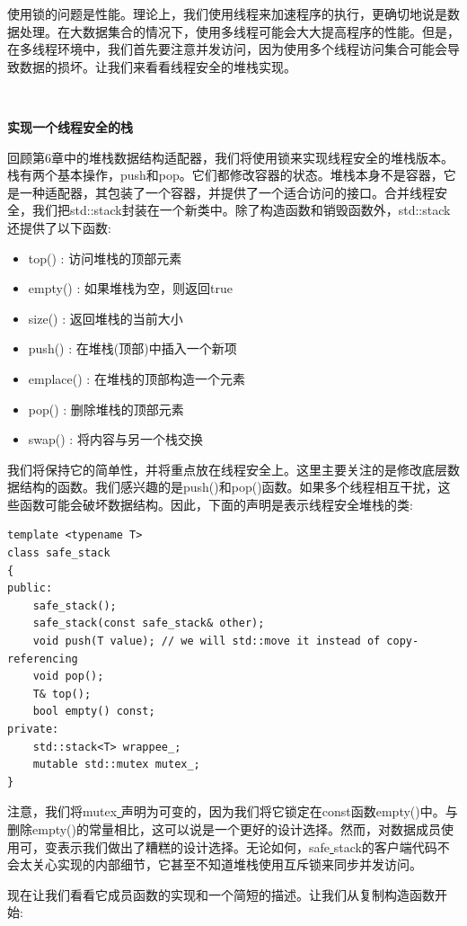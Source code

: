 使用锁的问题是性能。理论上，我们使用线程来加速程序的执行，更确切地说是数据处理。在大数据集合的情况下，使用多线程可能会大大提高程序的性能。但是，在多线程环境中，我们首先要注意并发访问，因为使用多个线程访问集合可能会导致数据的损坏。让我们来看看线程安全的堆栈实现。 \par

\noindent\textbf{}\ \par
\textbf{实现一个线程安全的栈} \ \par
回顾第6章中的堆栈数据结构适配器，我们将使用锁来实现线程安全的堆栈版本。栈有两个基本操作，push和pop。它们都修改容器的状态。堆栈本身不是容器，它是一种适配器，其包装了一个容器，并提供了一个适合访问的接口。合并线程安全，我们把std::stack封装在一个新类中。除了构造函数和销毁函数外，std::stack还提供了以下函数: \par

\begin{itemize}
	\item top() : 访问堆栈的顶部元素
	\item empty() : 如果堆栈为空，则返回true
	\item size() : 返回堆栈的当前大小
	\item push() : 在堆栈(顶部)中插入一个新项
	\item emplace() : 在堆栈的顶部构造一个元素
	\item pop() : 删除堆栈的顶部元素
	\item swap() : 将内容与另一个栈交换
\end{itemize}

我们将保持它的简单性，并将重点放在线程安全上。这里主要关注的是修改底层数据结构的函数。我们感兴趣的是push()和pop()函数。如果多个线程相互干扰，这些函数可能会破坏数据结构。因此，下面的声明是表示线程安全堆栈的类: \par

\begin{lstlisting}[caption={}]
template <typename T>
class safe_stack
{
public:
	safe_stack();
	safe_stack(const safe_stack& other);
	void push(T value); // we will std::move it instead of copy-referencing
	void pop();
	T& top();
	bool empty() const;
private:
	std::stack<T> wrappee_;
	mutable std::mutex mutex_;
}
\end{lstlisting}

注意，我们将mutex\underline{ }声明为可变的，因为我们将它锁定在const函数empty()中。与删除empty()的常量相比，这可以说是一个更好的设计选择。然而，对数据成员使用可，变表示我们做出了糟糕的设计选择。无论如何，safe\underline{ }stack的客户端代码不会太关心实现的内部细节，它甚至不知道堆栈使用互斥锁来同步并发访问。 \par
现在让我们看看它成员函数的实现和一个简短的描述。让我们从复制构造函数开始: \par

